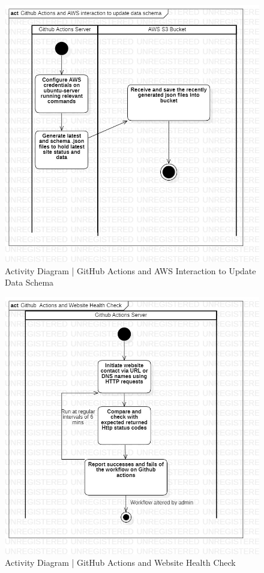 \begin{figure}[H]
  \centering
  \includegraphics[width=\linewidth]{img/activity-diagram-1.jpg}
  \caption{Activity Diagram | GitHub Actions and AWS Interaction to Update Data Schema}
\end{figure}

\begin{figure}[H]
  \centering
  \includegraphics[width=\linewidth]{img/activity-diagram-2.jpg}
  \caption{Activity Diagram | GitHub Actions and Website Health Check}
\end{figure}

